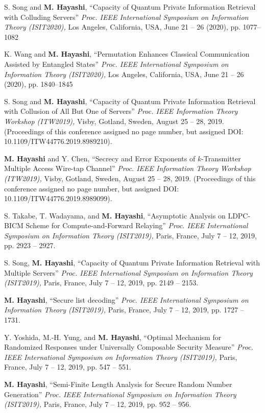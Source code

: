 \documentclass[a4paper,12pt,oneside]{article}
\begin{document}
\begin{enumerate}
S. Song and \textbf{M. Hayashi}, 
``Capacity of Quantum Private Information Retrieval with Colluding Servers''
{\em Proc. IEEE International Symposium on Information Theory (ISIT2020),} 
Los Angeles, California, USA, June 21 -- 26 (2020), pp. 1077--1082

K. Wang and \textbf{M. Hayashi}, 
``Permutation Enhances Classical Communication Assisted by Entangled States''
{\em Proc. IEEE International Symposium on Information Theory (ISIT2020),} 
Los Angeles, California, USA, June 21 -- 26 (2020), pp. 1840--1845


S. Song and \textbf{M. Hayashi}, 
``Capacity of Quantum Private Information Retrieval with Collusion of All But One of Servers''
{\em Proc. IEEE Information Theory Workshop (ITW2019),} 
Visby, Gotland, Sweden, August 25 -- 28, 2019. 
(Proceedings of this conference assigned no page number, but assigned DOI: 10.1109/ITW44776.2019.8989210).

\textbf{M. Hayashi} and Y. Chen,
``Secrecy and Error Exponents of $k$-Transmitter Multiple Access Wire-tap Channel''
{\em Proc. IEEE Information Theory Workshop (ITW2019),} 
Visby, Gotland, Sweden, August 25 -- 28, 2019. 
(Proceedings of this conference assigned no page number, but assigned DOI: 10.1109/ITW44776.2019.8989099).

S. Takabe, T. Wadayama, and \textbf{M. Hayashi}, 
``Asymptotic Analysis on LDPC-BICM Scheme for Compute-and-Forward Relaying''
{\em Proc. IEEE International Symposium on Information Theory (ISIT2019),} 
Paris, France, July 7 -- 12, 2019, pp. 2923 -- 2927. 

S. Song, \textbf{M. Hayashi}, 
``Capacity of Quantum Private Information Retrieval with Multiple Servers''
{\em Proc. IEEE International Symposium on Information Theory (ISIT2019),} 
Paris, France, July 7 -- 12, 2019, pp. 2149 -- 2153. 

\textbf{M. Hayashi}, 
``Secure list decoding'' 
{\em Proc. IEEE International Symposium on Information Theory (ISIT2019),} 
Paris, France, July 7 -- 12, 2019, pp. 1727 -- 1731. 

Y. Yoshida, M.-H. Yung, and \textbf{M. Hayashi}, 
``Optimal Mechanism for Randomized Responses under Universally Composable Security Measure'' 
{\em Proc. IEEE International Symposium on Information Theory (ISIT2019),} 
Paris, France, July 7 -- 12, 2019, pp. 547 -- 551. 

\textbf{M. Hayashi}, 
``Semi-Finite Length Analysis for Secure Random Number Generation'' 
{\em Proc. IEEE International Symposium on Information Theory (ISIT2019),} 
Paris, France, July 7 -- 12, 2019, pp. 952 -- 956. 


\end{enumerate}
\end{document}
